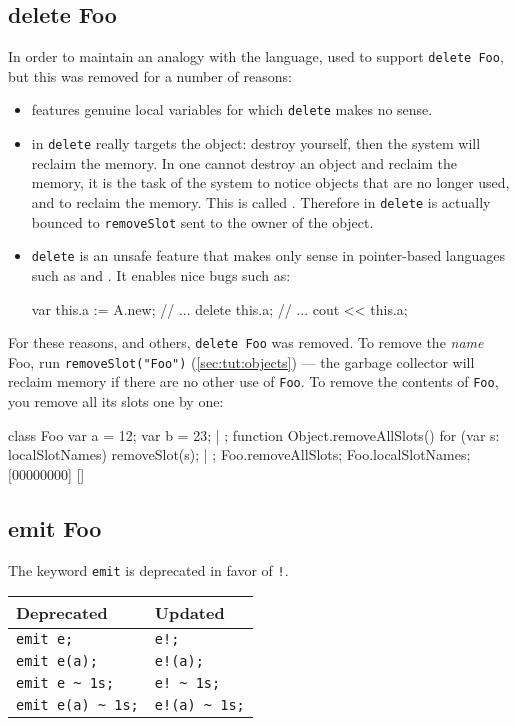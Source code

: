 \subsection{delete Foo}
\label{sec:k122:delete}
In order to maintain an analogy with the \Cxx language, \us used to
support \lstinline{delete Foo}, but this was removed for a number of
reasons:
\begin{itemize}
\item {} features genuine local variables for which
  \lstinline{delete} makes no sense.
\item in \Cxx \lstinline{delete} really targets the object: destroy
  yourself, then the system will reclaim the memory.  In \us one
  cannot destroy an object and reclaim the memory, it is the task of
  the system to notice objects that are no longer used, and to reclaim
  the memory.  This is called .  Therefore in
  \us \lstinline{delete} is actually bounced to \lstinline{removeSlot}
  sent to the owner of the object.
\item \lstinline{delete} is an unsafe feature that makes only sense in
  pointer-based languages such as \C and \Cxx.  It enables nice bugs
  such as:
\begin{urbiunchecked}
var this.a := A.new;
// ...
delete this.a;
// ...
cout << this.a;
\end{urbiunchecked}
\end{itemize}

For these reasons, and others, \lstinline{delete Foo} was removed.
To remove the \emph{name} Foo, run
{\lstinline{removeSlot("Foo")}} (\autoref{sec:tut:objects}) --- the
garbage collector will reclaim memory if there are no other use of
\lstinline{Foo}.  To remove the contents of
\lstinline{Foo}, you remove all its slots one by one:

\begin{urbiscript}[firstnumber=1]
class Foo
{
  var a = 12;
  var b = 23;
} | {};
function Object.removeAllSlots()
{
  for (var s: localSlotNames)
    removeSlot(s);
} | {};
Foo.removeAllSlots;
Foo.localSlotNames;
[00000000] []
\end{urbiscript}

\subsection{emit Foo}

The keyword \lstinline{emit} is deprecated in favor of \lstinline{!}.

\begin{center}
  \begin{tabular}{|l|l|}
    \hline
    \textbf{Deprecated} & \textbf{Updated}  \\
    \hline
    \lstinline|emit e;|         & \lstinline|e!;|          \\
    \lstinline|emit e(a);|      & \lstinline|e!(a);|       \\
    \lstinline|emit e ~ 1s;|    & \lstinline|e! ~ 1s;|     \\
    \lstinline|emit e(a) ~ 1s;| & \lstinline|e!(a) ~ 1s;|  \\
    \hline
  \end{tabular}
\end{center}

